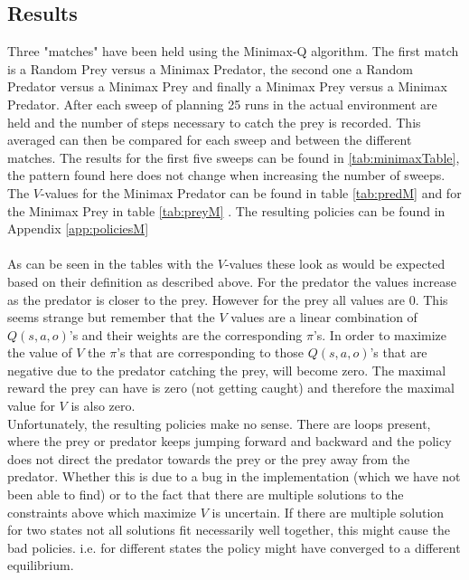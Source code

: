 \subsection{Results}
Three "matches" have been held using the Minimax-Q algorithm. The first match is a Random Prey versus a Minimax Predator, the second one a Random Predator versus a Minimax Prey and finally a Minimax Prey versus a Minimax Predator. After each sweep of planning 25 runs in the actual environment are held and the number of steps necessary to catch the prey is recorded. This averaged can then be compared for each sweep and between the different matches. The results for the first five sweeps can be found in \ref{tab:minimaxTable}, the pattern found here does not change when increasing the number of sweeps. The $V$-values for the Minimax Predator can be found in table \ref{tab:predM} and for the Minimax Prey in table \ref{tab:preyM} .  The resulting policies can be found in Appendix \ref{app:policiesM} \\\\
As can be seen in the tables with the $V$-values these look as would be expected based on their definition as described above. For the predator the values increase as the predator is closer to the prey. However for the prey all values are 0. This seems strange but remember that the $V$ values are a linear combination of $Q(s,a,o)$'s and their weights are the corresponding $\pi$'s. In order to maximize the value of $V$ the $\pi$'s that are corresponding to those $Q(s,a,o)$'s that are negative due to the predator catching the prey, will become zero. The maximal reward the prey can have is zero (not getting caught) and therefore the maximal value for $V$ is also zero.  \\
Unfortunately, the resulting policies make no sense. There are loops present, where the prey or predator keeps jumping forward and backward and the policy does not direct the predator towards the prey or the prey away from the predator. Whether this is due to a bug in the implementation (which we have not been able to find) or to the fact that there are multiple solutions to the constraints above which maximize $V$ is uncertain. If there are multiple solution for two states not all solutions fit necessarily well together, this might cause the bad policies. i.e. for different states the policy might have converged to a different equilibrium.\\
